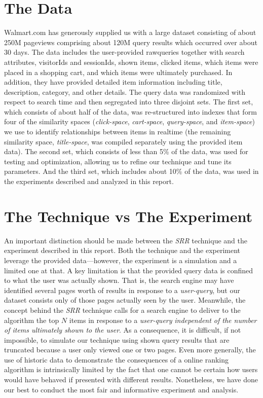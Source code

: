 \documentclass{article}
\begin{document}
\section{The Data}

Walmart.com has generously supplied us with a large dataset consisting of about
250M pageviews comprising about 120M query results which occurred over about 30
days. The data includes the user-provided rawqueries together with search
attributes, visitorIds and sessionIds, shown items, clicked items, which items
were placed in a shopping cart, and which items were ultimately purchased. In
addition, they have provided detailed item information including title,
description, category, and other details. The query data was randomized with
respect to search time and then segregated into three disjoint sets. The first
set, which consists of about half of the data, was re-structured into indexes
that form four of the similarity spaces ({\em click-space}, {\em cart-space},
{\em query-space}, and {\em item-space}) we use to identify relationships
between items in realtime (the remaining similarity space, {\em title-space},
was compiled separately using the provided item data). The second set, which
consists of less than 5\% of the data, was used for testing and optimization,
allowing us to refine our technique and tune its parameters. And the third set,
which includes about 10\% of the data, was used in the experiments described and
analyzed in this report.

\section{The Technique vs The Experiment}

An important distinction should be made between the {\em SRR} technique and the
experiment described in this report. Both the technique and the experiment
leverage the provided data---however, the experiment is a simulation and a
limited one at that. A key limitation is that the provided query data is
confined to what the user was actually shown. That is, the search engine may
have identified several pages worth of results in response to a {\em
user-query}, but our dataset consists only of those pages actually seen by the
user.  Meanwhile, the concept behind the {\em SRR} technique calls for a search
engine to deliver to the algorithm the top $N$ items in response to a {\em
user-query} {\em independent of the number of items ultimately shown to the
user}. As a consequence, it is difficult, if not impossible, to simulate our
technique using shown query results that are truncated because a user only
viewed one or two pages.  Even more generally, the use of historic data to
demonstrate the consequences of a online ranking algorithm is intrinsically
limited by the fact that one cannot be certain how users would have behaved if
presented with different results. Nonetheless, we have done our best to conduct
the most fair and informative experiment and analysis.
\end{document}
